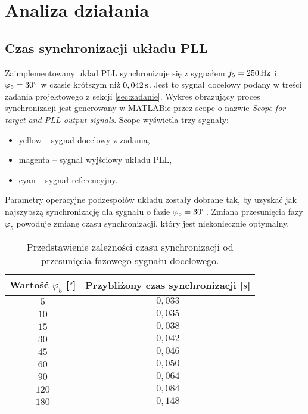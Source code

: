 \section{Analiza działania}

\subsection{Czas synchronizacji układu PLL}
Zaimplementowany układ PLL synchronizuje się z sygnałem $f_5 = \unit[250]{Hz}$ i
$\varphi_5 = 30^\circ$ w czasie krótszym niż $\unit[0,042]{s}$. Jest to sygnał
docelowy podany w treści zadania projektowego z sekcji \ref{sec:zadanie}. Wykres
obrazujący proces synchronizacji jest generowany w MATLABie przez scope o nazwie
\emph{Scope for target and PLL output signals}. Scope wyświetla trzy sygnały:
\begin{itemize}[nosep]
    \item yellow -- sygnał docelowy z zadania,
    \item magenta -- sygnał wyjściowy układu PLL,
    \item cyan -- sygnał referencyjny.
\end{itemize}

\noindent
Parametry operacyjne podzespołów układu zostały dobrane tak, by
uzyskać jak najszybszą synchronizację dla sygnału o fazie $\varphi_5 =
30^\circ$. Zmiana przesunięcia fazy $\varphi_5$ powoduje zmianę czasu
synchronizacji, który jest niekoniecznie optymalny.
\begin{table}[h]
    \centering
    \begin{tabular}{cc}
        \toprule
        \textbf{Wartość $\varphi_5$ [$\unit{\degree}$]} & \textbf{Przybliżony czas synchronizacji [$\unit{s}$]} \\
        \midrule
        $5$   & $0,033$ \\
        $10$  & $0,035$ \\
        $15$  & $0,038$ \\
        $30$  & $0,042$ \\
        $45$  & $0,046$ \\
        $60$  & $0,050$ \\
        $90$  & $0,064$ \\
        $120$ & $0,084$ \\
        $180$ & $0,148$ \\
        \bottomrule
    \end{tabular}
    \caption{Przedstawienie zależności czasu synchronizacji od przesunięcia fazowego sygnału docelowego.}
    \label{tab:analiza_czasy}
\end{table}

